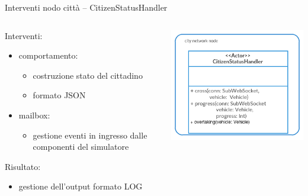 \begin{frame}{Interventi nodo città -- \scriptsize{CitizenStatusHandler}}
	\begin{columns}
		\begin{column}{0.6\textwidth}
			Interventi:
			\begin{itemize}
				\item{\footnotesize{comportamento:}}
				\begin{itemize}
					\item{\scriptsize{costruzione stato del cittadino}}
					\item{\scriptsize{formato JSON}}
				\end{itemize}
				\item{\footnotesize{mailbox:}}
				\begin{itemize}
					\item{\scriptsize{gestione eventi in ingresso dalle componenti del simulatore}}
				\end{itemize}
			\end{itemize}
			Risultato:
			\begin{itemize}
				\item{\footnotesize{gestione dell'output formato LOG}}
			\end{itemize}
		\end{column}
		\begin{column}{0.4\textwidth}
			\centering
			\includegraphics[scale=0.35]{images/citizenStatusHandler.png}
		\end{column}
	\end{columns}
\end{frame}

